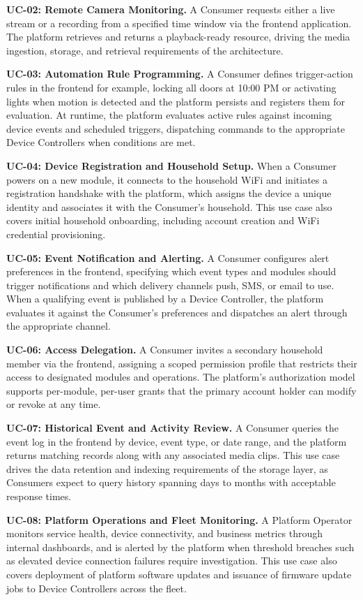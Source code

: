 \textbf{UC-02: Remote Camera Monitoring.} A Consumer requests either a live stream or a recording from a specified time window via the frontend application. The platform retrieves and returns a playback-ready resource, driving the media ingestion, storage, and retrieval requirements of the architecture.

\textbf{UC-03: Automation Rule Programming.} A Consumer defines trigger-action rules in the frontend for example, locking all doors at 10:00 PM or activating lights when motion is detected and the platform persists and registers them for evaluation. At runtime, the platform evaluates active rules against incoming device events and scheduled triggers, dispatching commands to the appropriate Device Controllers when conditions are met.

\textbf{UC-04: Device Registration and Household Setup.} When a Consumer powers on a new module, it connects to the household WiFi and initiates a registration handshake with the platform, which assigns the device a unique identity and associates it with the Consumer's household. This use case also covers initial household onboarding, including account creation and WiFi credential provisioning.

\textbf{UC-05: Event Notification and Alerting.} A Consumer configures alert preferences in the frontend, specifying which event types and modules should trigger notifications and which delivery channels push, SMS, or email to use. When a qualifying event is published by a Device Controller, the platform evaluates it against the Consumer's preferences and dispatches an alert through the appropriate channel.

\textbf{UC-06: Access Delegation.} A Consumer invites a secondary household member via the frontend, assigning a scoped permission profile that restricts their access to designated modules and operations. The platform's authorization model supports per-module, per-user grants that the primary account holder can modify or revoke at any time.

\textbf{UC-07: Historical Event and Activity Review.} A Consumer queries the event log in the frontend by device, event type, or date range, and the platform returns matching records along with any associated media clips. This use case drives the data retention and indexing requirements of the storage layer, as Consumers expect to query history spanning days to months with acceptable response times.

\textbf{UC-08: Platform Operations and Fleet Monitoring.} A Platform Operator monitors service health, device connectivity, and business metrics through internal dashboards, and is alerted by the platform when threshold breaches such as elevated device connection failures require investigation. This use case also covers deployment of platform software updates and issuance of firmware update jobs to Device Controllers across the fleet.

\endgroup